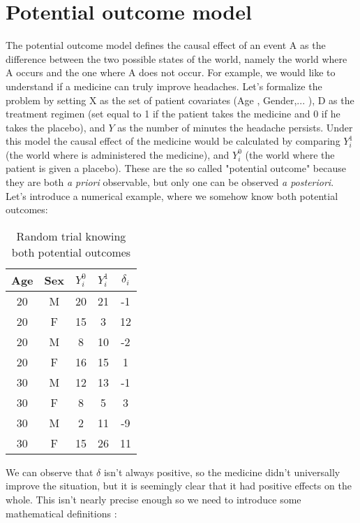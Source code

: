 \chapter{Potential outcome model}
\label{chapt:PotentialOM}
The potential outcome model defines the causal effect of an event A as the difference between the two possible states of the world, namely the world where A occurs and the one where A does not occur.
For example, we would like to understand if a medicine can truly improve headaches. Let's formalize the problem by setting X as the set of patient covariates (Age , Gender,... ), D as the treatment regimen (set equal to 1 if the patient takes the medicine and 0 if he takes the placebo), and $Y$ as the number of minutes the headache persists.
Under this model the causal effect of the medicine would be calculated by comparing $Y^{1}_i$ (the world where is administered the medicine), and  $Y^{0}_i$ (the world where the patient is given a placebo). These are the so called "potential outcome" because they are both \textit{a priori} observable, but only one can be observed \textit{a posteriori}. Let's introduce a numerical example, where we somehow know both potential outcomes:
\begin{table}[H]
\centering
\begin{tabular}{|c|c|c|c|c|}
\hline
Age & Sex & $Y^{0}_i$ & $Y^{1}_i$ & $\delta_i$ \\ \hline
20 & M & 20 & 21 & -1  \\ \hline
20 & F & 15 & 3 & 12 \\ \hline
20 & M & 8 & 10 & -2 \\ \hline
20 & F & 16 & 15 & 1 \\ \hline
30 & M & 12 & 13 & -1 \\ \hline
30 & F & 8 & 5 & 3 \\ \hline
30 & M & 2 & 11 & -9  \\ \hline
30 & F & 15 & 26 & 11 \\ \hline
\end{tabular}
\caption{Random trial knowing both potential outcomes }
\label{rt_kbpo}
\end{table}
We can observe that $\delta$ isn't always positive, so the medicine didn't universally improve the situation, but it is seemingly clear that it had positive effects on the whole. This isn't nearly precise enough so we need to introduce some mathematical definitions :
